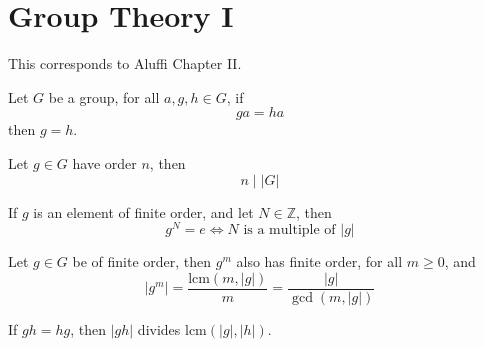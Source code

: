 \documentclass[openany]{book}
\begin{document}







\chapter{Group Theory I}
This corresponds to Aluffi Chapter II.

\begin{prop}
    Let $G$ be a group, for all $a,g,h\in G$, if 
    \begin{equation*}
        ga=ha
    \end{equation*}
    then $g=h$.
\end{prop}

\begin{prop}
    Let $g\in G$ have order $n$, then 
    \begin{equation*}
        n\mid |G|
    \end{equation*}
\end{prop}

\begin{cor}
    If $g$ is an element of finite order, and let $N\in\mathbb{Z}$, then 
    \begin{equation*}
        g^N=e \iff N \text{ is a multiple of }|g|
    \end{equation*}
\end{cor}

\begin{prop}
    Let $g\in G$ be of finite order, then $g^m$ also has finite order, for all $m\geq 0$, and 
    \begin{equation*}
        \left|g^m\right|=\frac{\text{lcm}(m,|g|)}{m}=\frac{|g|}{\gcd(m,|g|)}
    \end{equation*}
\end{prop}

\begin{prop}
    If $gh=hg$, then $|gh|$ divides $\text{lcm}(|g|,|h|)$.
\end{prop}
\end{document}
